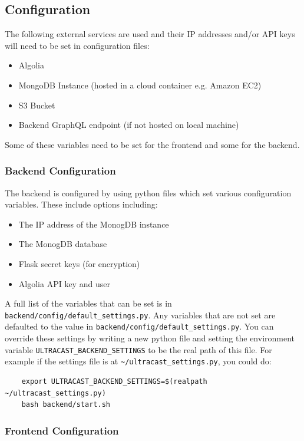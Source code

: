 \documentclass[../report.tex]{subfiles}
\begin{document}
\subsection{Configuration}

The following external services are used and their IP addresses and/or API keys will need to be set in configuration files:

\begin{itemize}
    \item Algolia
    \item MongoDB Instance (hosted in a cloud container e.g. Amazon EC2)
    \item S3 Bucket
    \item Backend GraphQL endpoint (if not hosted on local machine)
\end{itemize}

Some of these variables need to be set for the frontend and some for the backend.

\subsubsection{Backend Configuration}

The backend is configured by using python files which set various configuration variables. These include options including:
\begin{itemize}
    \item The IP address of the MonogDB instance
    \item The MonogDB database
    \item Flask secret keys (for encryption)
    \item Algolia API key and user
\end{itemize}
A full list of the variables that can be set is in \verb|backend/config/default_settings.py|.
%
Any variables that are not set are defaulted to the value in \verb|backend/config/default_settings.py|.
You can override these settings by writing a new python file and setting the environment variable \verb|ULTRACAST_BACKEND_SETTINGS| to be the real path of this file. 
For example if the settings file is at \verb|~/ultracast_settings.py|, you could do:

\begin{verbatim}
    export ULTRACAST_BACKEND_SETTINGS=$(realpath ~/ultracast_settings.py)
    bash backend/start.sh
\end{verbatim}

\subsubsection{Frontend Configuration}
\end{document}
